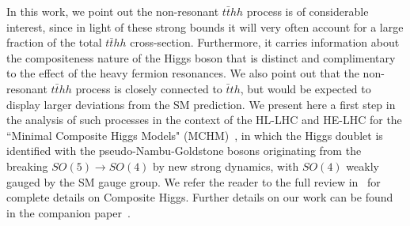 
In this work, we point out the non-resonant ${t\bar t}hh$ process is of considerable interest, since in light of these strong bounds it will very often account for a large fraction of the total ${t\bar t}hh$ cross-section. Furthermore, it carries
information about the compositeness nature of the Higgs boson that is distinct and complimentary to the effect of the heavy fermion resonances. We also point out that the non-resonant
${t\bar t}hh$ process is closely connected to ${\bar t}th$, but would be expected to display larger deviations from the
SM prediction.  We present here a first step in the analysis of such
processes in the context of the HL-LHC and HE-LHC for the ``Minimal Composite Higgs
Models" (MCHM)~\cite{Agashe:2004rs}, in which the Higgs doublet is identified with the pseudo-Nambu-Goldstone bosons originating from the breaking $SO(5) \to SO(4)$ by new strong dynamics, with $SO(4)$ weakly gauged by the SM gauge group. We refer the
reader to the full review in~\cite{Panico:2015jxa} for complete
details on Composite Higgs.  Further details on our work
 can be found in the companion paper~\cite{MCHMtthh}.


